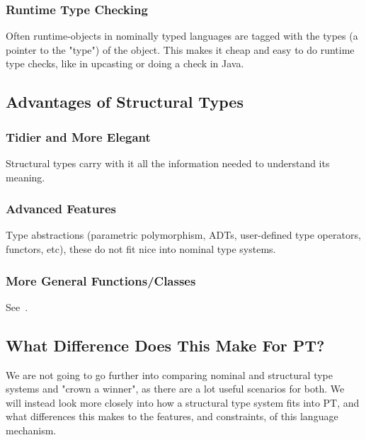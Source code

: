 \subsubsection{Runtime Type Checking}\label{subsubsec:runtime-type-checking}

Often runtime-objects in nominally typed languages are tagged with the types (a pointer to the "type") of the object.
This makes it cheap and easy to do runtime type checks, like in upcasting or doing a  check in Java.

\subsection{Advantages of Structural Types}\label{subsec:advantages-of-structural-types}

\subsubsection{Tidier and More Elegant}\label{subsubsec:tidier-and-more-elegant}

Structural types carry with it all the information needed to understand its meaning.

\subsubsection{Advanced Features}\label{subsubsec:advanced-type-features}

Type abstractions (parametric polymorphism, ADTs, user-defined type operators, functors, etc), these do not fit nice into nominal type systems.

\subsubsection{More General Functions/Classes}\label{subsubsec:more-general-functions}

See~\cite{malayeri}.

\subsection{What Difference Does This Make For PT?}\label{subsec:what-difference-does-this-make-for-pt?}

We are not going to go further into comparing nominal and structural type systems and "crown a winner", as there are a lot useful scenarios for both.
We will instead look more closely into how a structural type system fits into PT, and what differences this makes to the features, and constraints, of this language mechanism.

